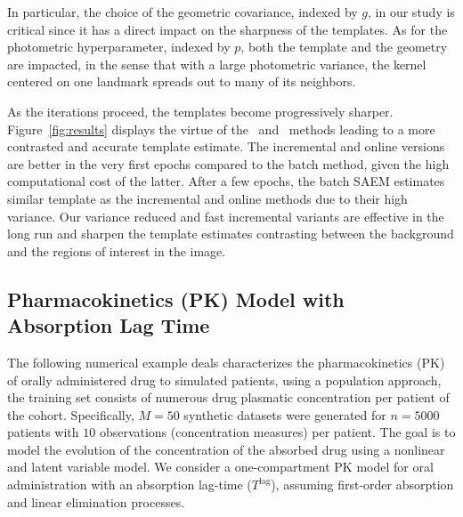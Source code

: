 \documentclass[bj]{imsart}
\numberwithin{equation}{section}
\theoremstyle{plain}
\begin{document}
In particular, the choice of the geometric covariance, indexed by $g$, in our study is critical since it has a direct impact on the {sharpness} of the templates.
As for the photometric hyperparameter, indexed by $p$, both the template and the geometry are impacted, in the sense that with a large photometric variance, the kernel centered on one landmark {spreads out} to many of its neighbors.


As the iterations proceed, the templates become progressively sharper.
Figure~\ref{fig:results} displays the virtue of the \SAEMVR\ and \FISAEM\ methods leading to a more {contrasted} and {accurate} template estimate. 
The incremental and online versions are better in the very first epochs compared to the batch method, given the high computational cost of the latter. 
After a few epochs, the batch SAEM estimates similar template as the incremental and online methods due to their high variance. 
Our variance reduced and fast incremental variants are effective in the long run and sharpen the template estimates contrasting between the background and the regions of interest in the image.

\subsection{Pharmacokinetics (PK) Model with Absorption Lag Time}
The following numerical example deals characterizes the pharmacokinetics (PK) of orally administered drug to simulated patients, using a population approach, \ie the training set consists of numerous drug plasmatic concentration per patient of the cohort. 
Specifically, $M = 50$ synthetic datasets were generated for $n = 5000$ patients with $10$ observations (concentration measures) per patient.
The goal is to model the evolution of the concentration of the absorbed drug using a {nonlinear} and {latent} variable model. 
We consider a one-compartment PK model for oral administration with an absorption lag-time ($T^{\textrm{lag}}$), assuming first-order absorption and linear elimination processes.
\end{document}
